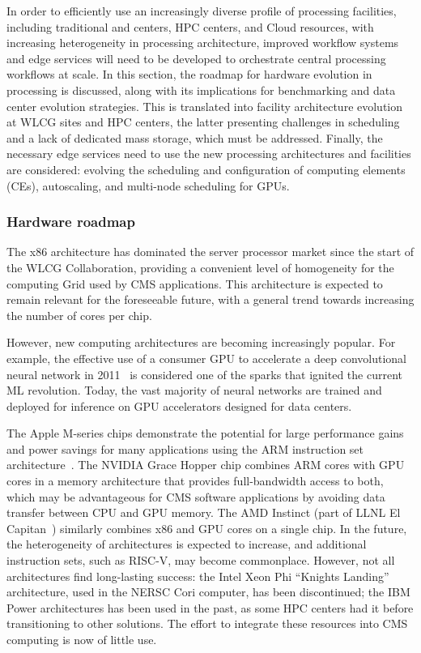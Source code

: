 In order to efficiently use an increasingly diverse profile of processing facilities, including traditional \TierOne and \TierTwo centers, \gls{HPC} centers, and Cloud resources, with increasing heterogeneity in processing architecture, improved workflow systems and edge services will need to be developed to orchestrate central processing workflows at scale. In this section, the roadmap for hardware evolution in processing is discussed, along with its implications for benchmarking and data center evolution strategies. This is translated into facility architecture evolution at \gls{WLCG} sites and \gls{HPC} centers, the latter presenting challenges in scheduling and a lack of dedicated mass storage, which must be addressed. Finally, the necessary edge services need to use the new processing architectures and facilities are considered: evolving the scheduling and configuration of computing elements (CEs), autoscaling, and multi-node scheduling for \glspl{GPU}.

\subsubsection{Hardware roadmap}
\label{sec:processing-roadmap}

The x86 architecture has dominated the server processor market since the start of the \gls{WLCG} Collaboration, providing a convenient level of homogeneity for the computing Grid used by CMS applications. This architecture is expected to remain relevant for the foreseeable future, with a general trend towards increasing the number of cores per chip. 

However, new computing architectures are becoming increasingly popular. For example, the effective use of a consumer \gls{GPU} to accelerate a deep convolutional neural network in 2011~\cite{NIPS2012_c399862d} is considered one of the sparks that ignited the current \gls{ML} revolution. Today, the vast majority of neural networks are trained and deployed for inference on \gls{GPU} accelerators designed for data centers. 

The Apple M-series chips demonstrate the potential for large performance gains and power savings for many applications using the \gls{ARM} instruction set architecture~\cite{AppleSilicon}. The NVIDIA Grace Hopper chip combines \gls{ARM} cores with \gls{GPU} cores in a memory architecture that provides full-bandwidth access to both, which may be advantageous for CMS software applications by avoiding data transfer between \gls{CPU} and \gls{GPU} memory. The AMD Instinct (part of \gls{LLNL} El Capitan~\cite{el-capitan}) similarly combines x86 and \gls{GPU} cores on a single chip. In the future, the heterogeneity of architectures is expected to increase, and additional instruction sets, such as \gls{RISC}-V, may become commonplace. However, not all architectures find long-lasting success: the Intel Xeon Phi ``Knights Landing'' architecture, used in the \gls{NERSC} Cori computer, has been discontinued; the IBM Power architectures has been used in the past, as some HPC centers had it before transitioning to other solutions. The effort to integrate these resources into CMS computing is now of little use.

